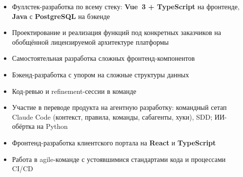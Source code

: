 \begin{itemize}
  \item Фуллстек-разработка по всему стеку: \textbf{Vue~3 + TypeScript} на фронтенде, \textbf{Java} с \textbf{PostgreSQL} на бэкенде
  \item Проектирование и реализация функций под конкретных заказчиков на обобщённой лицензируемой архитектуре платформы
  \item Самостоятельная разработка сложных фронтенд-компонентов
  \item Бэкенд-разработка с упором на сложные структуры данных
  \item Код-ревью и refinement-сессии в команде
  \item Участие в переводе продукта на агентную разработку: командный сетап Claude Code (контекст, правила, команды, сабагенты, хуки), SDD; ИИ-обёртка на Python
\end{itemize}

\begin{itemize}
  \item Фронтенд-разработка клиентского портала на \textbf{React} и \textbf{TypeScript}
  \item Работа в agile-команде с устоявшимися стандартами кода и процессами CI/CD
\end{itemize}

